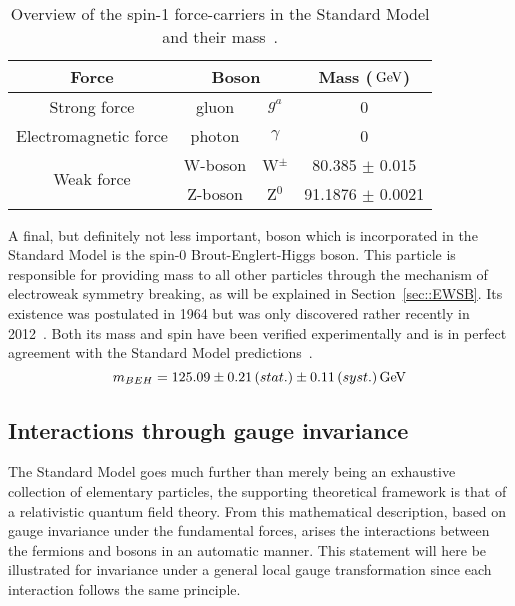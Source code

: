 \\
\begin{table}[h!t]
 \centering
 \caption{Overview of the spin-1 force-carriers in the Standard Model and their mass~\cite{PDGReview}.} \label{table::ForceCarriers}
 \begin{tabular}{|c|cc|c|}%
  \hline
  \textbf{Force} 		&\multicolumn{2}{c|}{\textbf{Boson}} 	& \textbf{Mass ($\, \mathrm{GeV}$)}	\\ %
  \hline
  Strong force 			& gluon 	& $g^{a}$		& 0 				\\ %
  \hline
  Electromagnetic force		& photon 	& $\gamma$ 		& 0 				\\ %
  \hline
  \multirow{2}{*}{Weak force} 	& W-boson 	& W$^{\pm}$ 		& 80.385 $\pm$ 0.015		\\ %
				& Z-boson 	& Z$^{0}$ 		& 91.1876 $\pm$ 0.0021		\\ %
  \hline
 \end{tabular}
\end{table}

A final, but definitely not less important, boson which is incorporated in the Standard Model is the spin-0 Brout-Englert-Higgs boson. This particle is responsible for providing mass to all other particles through the mechanism of electroweak symmetry breaking, as will be explained in Section~\ref{sec::EWSB}. Its existence was postulated in 1964 but was only discovered rather recently in 2012~\cite{HiggsDiscCMS, HiggsDiscAtlas}. Both its mass and spin have been verified experimentally and is in perfect agreement with the Standard Model predictions~\cite{HiggsMass, HiggsSpin}.
\begin{equation}
 m_{BEH} = 125.09 \pm 0.21 \, (stat.) \pm 0.11 \, (syst.) \, \mathrm{GeV}
\end{equation}

\subsection{Interactions through gauge invariance}
The Standard Model goes much further than merely being an exhaustive collection of elementary particles, the supporting theoretical framework is that of a relativistic quantum field theory.
From this mathematical description, based on gauge invariance under the fundamental forces, arises the interactions between the fermions and bosons in an automatic manner.
This statement will here be illustrated for invariance under a general local gauge transformation since each interaction follows the same principle.
\\

